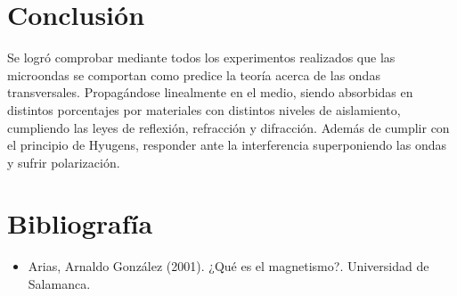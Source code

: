\documentclass[a4paper,twocolumn,10pt]{article}
\begin{document}
\section{Conclusión}
Se logró comprobar mediante todos los experimentos realizados que las microondas se comportan como predice la teoría acerca de las ondas transversales. Propagándose linealmente en el medio, siendo absorbidas en distintos porcentajes por materiales con distintos niveles de aislamiento, cumpliendo las leyes de reflexión, refracción y difracción. Además de cumplir con el principio de Hyugens, responder ante la interferencia superponiendo las ondas y sufrir polarización.


\section{Bibliografía}


\begin{itemize}
\item Arias, Arnaldo González (2001). ¿Qué es el magnetismo?. Universidad de Salamanca.
\end{itemize}
\end{document}
